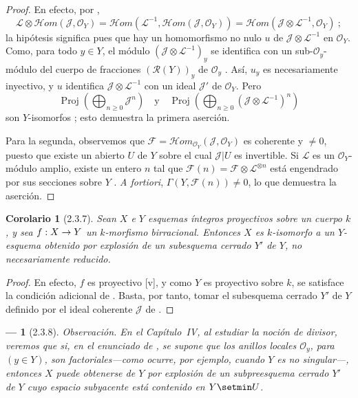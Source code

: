 \documentclass[10pt,oneside,openany]{book}
\theoremstyle{egaenv}\newtheorem*{env}{---}
\theoremstyle{egastatement}
\newtheorem*{corollary}{Corolario}
\theoremstyle{egadescription}
\newcommand{\oldpage}[2][]{\marginnote{\normalfont\scriptsize\textbf{#1}\,|\,#2}\ignorespaces}
\renewcommand{\geq}{\geqslant}
\renewcommand{\to}{\mathchoice{\longrightarrow}{\rightarrow}{\rightarrow}{\rightarrow}}
\begin{document}
\begin{proof}
En efecto, por ,
\[
\mathcal L\otimes\mathcal{H}om(\mathcal J,\mathcal O_Y)
=\mathcal{H}om(\mathcal L^{-1},\mathcal{H}om(\mathcal J,\mathcal O_Y))
=\mathcal{H}om(\mathcal J\otimes\mathcal L^{-1},\mathcal O_Y)~;
\]
la hipótesis significa pues que hay un homomorfismo no nulo $u$ de
$\mathcal J\otimes\mathcal L^{-1}$ en $\mathcal O_Y$. Como, para todo
$y\in Y$, el módulo $(\mathcal J\otimes\mathcal L^{-1})_y$ se identifica con un sub-$\mathcal O_y$-módulo del cuerpo de fracciones $(\mathcal R(Y))_y$ de $\mathcal O_y$ .
Así, $u_y$ es necesariamente inyectivo, y $u$ identifica $\mathcal J\otimes\mathcal L^{-1}$ con un ideal $\mathcal J'$ de $\mathcal O_Y$.
Pero
\[
\operatorname{Proj}\left(\bigoplus_{n\geq0}\mathcal J^n\right)
\quad\text{y}\quad
\operatorname{Proj}\left(
\bigoplus_{n\geq0}(\mathcal J\otimes\mathcal L^{-1})^n\right)
\]
son $Y$-isomorfos ; esto demuestra la primera aserción.

Para la segunda, observemos que
$\mathcal F=\mathcal{H}om_{\mathcal O_Y}(\mathcal J,\mathcal O_Y)$ es
coherente y $\neq0$, puesto que existe un abierto $U$ de $Y$ sobre el cual $\mathcal J|U$ es invertible.
Si $\mathcal L$ es un $\mathcal O_Y$-módulo amplio, existe un entero $n$ tal que
$\mathcal F(n)=\mathcal F\otimes\mathcal L^{\otimes n}$
está engendrado por sus secciones sobre $Y$ .
\emph{A fortiori},
$\Gamma(Y,\mathcal F(n))\neq0$,
lo que demuestra la aserción.
\end{proof}

\begin{corollary}[2.3.7]
\label{III.2.3.7}
\label{III.2.3.7-fr}
Sean $X$ e $Y$ esquemas íntegros proyectivos sobre un cuerpo $k$, y sea
$f:X\to Y$
un $k$-morfismo birracional.
Entonces $X$ es $k$-isomorfo a un $Y$-esquema obtenido por explosión de un subesquema cerrado $Y'$ de $Y$, no necesariamente reducido.
\end{corollary}

\begin{proof}
\oldpage[III]{107}
En efecto, $f$ es proyectivo [v], y como $Y$ es proyectivo sobre $k$, se satisface la condición adicional de .
Basta, por tanto, tomar el subesquema cerrado $Y'$ de $Y$ definido por el ideal coherente $\mathcal J$ de .
\end{proof}

\begin{env}[2.3.8]
\label{III.2.3.8}
\label{III.2.3.8-fr}
\emph{Observación.}
En el Capítulo~IV, al estudiar la noción de divisor, veremos que si, en el enunciado de , se supone que los anillos locales $\mathcal O_y$, para $(y\in Y)$, son factoriales---como ocurre, por ejemplo, cuando $Y$ es no singular---, entonces $X$ puede obtenerse de $Y$ por explosión de un subpreesquema cerrado $Y'$ de $Y$ cuyo espacio subyacente está contenido en $Y\setmin U$.
\end{env}
\end{document}
